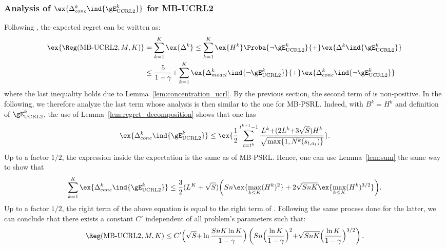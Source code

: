 \begin{subappendices}
\subsubsection{Analysis of $\ex{\Delta_{conc}^k\ind{\gE_\text{UCRL2}^{k}}}$ for MB-UCRL2}
Following , the expected regret can be written as:
\begin{align}
    \ex{\Reg(\text{MB-UCRL2},M,K)}
    &= \sum_{k=1}^K \ex{\Delta^k} \le \sum_{k=1}^{K}\ex{H^k}\Proba{\neg \gE_\text{UCRL2}^{k}} {+}\ex{\Delta^k \ind{\gE_\text{UCRL2}^{k}}} \nonumber \\
    &\le \frac{5}{1-\gamma} {+} \sum_{k=1}^{K} \ex{\Delta_{model}^k\ind{\lnot\gE_\text{UCRL2}^{k}}} {+} \ex{\Delta_{conc}^k\ind{\lnot\gE_\text{UCRL2}^{k}}}
    \label{eq:proof_UCRL2_regret}
\end{align}
where the last inequality holds due to Lemma~\ref{lem:concentration_ucrl}.
By the previous section, the second term of  is non-positive.
In the following, we therefore analyze the last term whose analysis is then similar to the one for MB-PSRL.  Indeed, with $B^k=H^k$ and definition of $\gE^{k}_\text{UCRL2}$, the use of Lemma~\ref{lem:regret_decomposition} shows that one has
\begin{align*}
    \ex{\Delta_{conc}^k\ind{\gE^{k}_\text{UCRL2}}} \le \ex{\frac12 \sum_{t=t^k}^{t^{k+1}-1}\frac{L^{k} {+}(2L^{k} {+} 3\sqrt{S}) H^k}{\sqrt{\max\{1,N^{k}(s_{t,a_t})\} }}}.
\end{align*}
Up to a factor $1/2$, the expression inside the expectation is the same as  of MB-PSRL. Hence, one can use Lemma~\ref{lem:sum} the same way to show that
\begin{align*}
    \sum_{k=1}^{K} \ex{\Delta^k_{conc}\ind{\gE^{k}_\text{UCRL2}}}
    \le \frac32(L^K+\sqrt{S})\bigg(Sn\ex{\max_{k\le K}(H^k)^2} +2\sqrt{SnK} \ex{\max_{k\le K}(H^k)^{3/2}}\bigg).
\end{align*}
Up to a factor $1/2$, the right term of the above equation is equal to the right term of . Following the same process done for the latter, we can conclude that there exists a constant $C'$ independent of all problem's parameters such that:
\begin{align*}
    \Reg(\text{MB-UCRL2},M,K) \le C'\Bigl(\sqrt{S}{+}\ln \frac{SnK\ln K}{1-\gamma}\Bigr) \left(Sn\Bigl(\frac{\ln K}{1-\gamma}\Bigr)^{2}
    {+}\sqrt{SnK}\Bigl(\frac{\ln K}{1-\gamma}\Bigr)^{3/2}\right).
\end{align*}



\end{subappendices}
